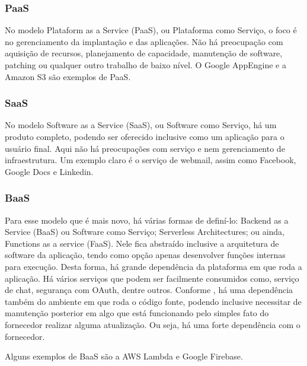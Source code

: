 
\subsubsection{PaaS}\label{paas}

No modelo Plataform as a Service (PaaS), ou Plataforma como Serviço,
o foco é no gerenciamento da implantação e das aplicações.
Não há preocupação com aquisição de recursos, planejamento de capacidade,
manutenção de software, patching ou qualquer outro trabalho de baixo nível.
O Google AppEngine e a Amazon S3 são exemplos de PaaS.

\subsubsection{SaaS}\label{saas}

No modelo Software as a Service (SaaS), ou Software como Serviço,
há um produto completo, podendo ser oferecido inclusive como um aplicação
para o usuário final.
Aqui não há preocupações com serviço e nem gerenciamento de infraestrutura.
Um exemplo claro é o serviço de webmail, assim como Facebook,
Google Docs e Linkedin.

\subsubsection{BaaS}\label{baas}

Para esse modelo que é mais novo, há várias formas de definí-lo:
Backend as a Service (BaaS) ou Software como Serviço; Serverless Architectures; ou ainda,
Functions as a service (FaaS).
Nele fica abstraído inclusive a arquitetura de software da aplicação,
tendo como opção apenas desenvolver funções internas para execução. Desta forma, há grande
dependência da plataforma em que roda a aplicação.
Há vários serviços que podem ser facilmente consumidos como, serviço de chat, segurança com
OAuth, dentre outros.
Conforme \cite{martin-serverless}, há uma dependência também do ambiente em que roda o
código fonte, podendo inclusive necessitar de manutenção posterior em algo que está
funcionando pelo simples fato do fornecedor realizar alguma atualização.
Ou seja, há uma forte dependência com o fornecedor.

Alguns exemplos de BaaS são a AWS Lambda e Google Firebase.

